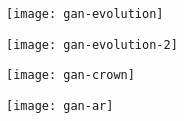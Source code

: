 \begin{frame}{}
\begin{figure}[!]
\centering
\texttt{[image: gan-evolution]}
\end{figure}
\end{frame}


\begin{frame}{}
\begin{figure}[!]
\centering
\texttt{[image: gan-evolution-2]}
\end{figure}
\end{frame}

\begin{frame}{}
\begin{figure}[!]
\centering
\texttt{[image: gan-crown]}
\end{figure}
\end{frame}




\begin{frame}{}
\begin{figure}[!]
\centering
\texttt{[image: gan-ar]}
\end{figure}
\end{frame}





